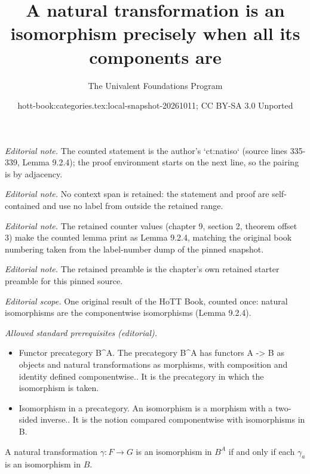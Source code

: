 \documentclass[10pt,a4paper]{article}
\title{A natural transformation is an isomorphism precisely when all its components are}
\author{The Univalent Foundations Program}
\date{hott-book:categories.tex:local-snapshot-20261011; CC BY-SA 3.0 Unported}
\newcounter{chapter}
\providecommand{\index}[1]{}
\theoremstyle{definition}
\theoremstyle{remark}
\numberwithin{equation}{section}
\begin{document}
\maketitle
\setcounter{chapter}{9}
\setcounter{section}{2}
\setcounter{thm}{3}
\noindent\textit{Editorial note.} The counted statement is the author's `ct:natiso` (source lines 335-339, Lemma 9.2.4); the proof environment starts on the next line, so the pairing is by adjacency.\par\medskip
\noindent\textit{Editorial note.} No context span is retained: the statement and proof are self-contained and use no label from outside the retained range.\par\medskip
\noindent\textit{Editorial note.} The retained counter values (chapter 9, section 2, theorem offset 3) make the counted lemma print as Lemma 9.2.4, matching the original book numbering taken from the label-number dump of the pinned snapshot.\par\medskip
\noindent\textit{Editorial note.} The retained preamble is the chapter's own retained starter preamble for this pinned source.\par\medskip
\noindent\textit{Editorial scope.} One original result of the HoTT Book, counted once: natural isomorphisms are the componentwise isomorphisms (Lemma 9.2.4).\par\medskip
\noindent\textit{Allowed standard prerequisites (editorial).}\begin{itemize}
\item Functor precategory B\textasciicircum{}A. The precategory B\textasciicircum{}A has functors A -> B as objects and natural transformations as morphisms, with composition and identity defined componentwise.. It is the precategory in which the isomorphism is taken.
\item Isomorphism in a precategory. An isomorphism is a morphism with a two-sided inverse.. It is the notion compared componentwise with isomorphisms in B.
\end{itemize}\medskip
\begin{lem}\label{ct:natiso}
  \index{natural!isomorphism}%
  \index{isomorphism!natural}%
  A natural transformation $\gamma:F\to G$ is an isomorphism in $B^A$ if and only if each $\gamma_a$ is an isomorphism in $B$.
\end{lem}
\end{document}
